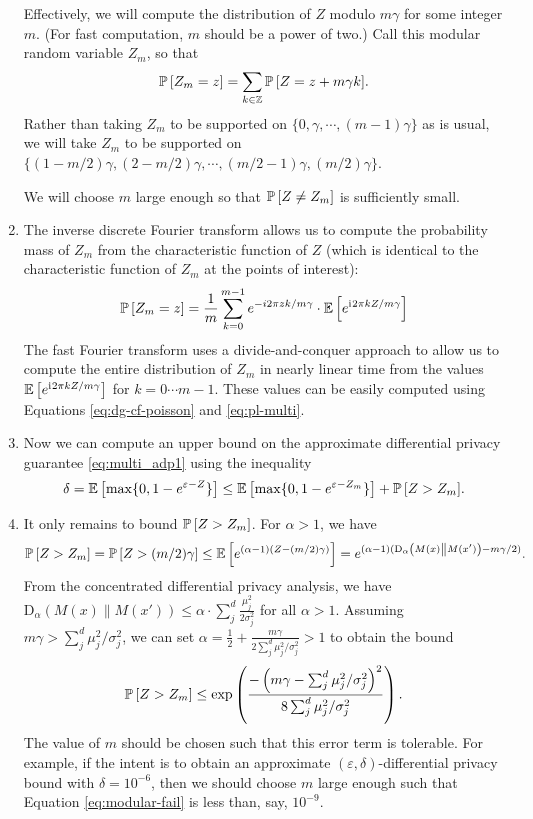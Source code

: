 \documentclass{jpc}
\newcommand{\ii}{\mathrm{i}\mkern1mu}
\newcommand{\ex}[2]{{\ifx&#1& \mathbb{E} \else
\underset{#1}{\mathbb{E}} \fi \left[#2\right]}}
\newcommand{\pr}[2]{{\ifx&#1& \mathbb{P} \else
\underset{#1}{\mathbb{P}} \fi \left[#2\right]}}
\newcommand{\dr}[3]{\mathrm{D}_{#1}\left(#2\middle\|#3\right)}
\newcommand{\eps}{\varepsilon}
\newcommand{\Z}{\mathbb{Z}}
\begin{document}
\begin{enumerate}
    Effectively, we will compute the distribution of $Z$ modulo $m\gamma$ for some integer $m$. (For fast computation, $m$ should be a power of two.) Call this modular random variable $Z_m$, so that \[\pr{}{Z_m=z} = \sum_{k \in \Z} \pr{}{Z=z+m\gamma k}.\]
    Rather than taking $Z_m$ to be supported on $\{0,\gamma,\cdots,(m-1)\gamma\}$ as is usual, we will take $Z_m$ to be supported on $\{(1-m/2)\gamma,(2-m/2)\gamma, \cdots, (m/2-1)\gamma,(m/2)\gamma\}$.
    
    We will choose $m$ large enough so that $\pr{}{Z \ne Z_m}$ is sufficiently small.
    
    \item The inverse discrete Fourier transform allows us to compute the probability mass of $Z_m$ from the characteristic function of $Z$ (which is identical to the characteristic function of $Z_m$ at the points of interest):
    \begin{equation}
        \pr{}{Z_m=z} = \frac{1}{m} \sum_{k=0}^{m-1} e^{-i 2\pi zk / m\gamma} \cdot \ex{}{e^{\ii{} 2\pi k Z/m\gamma}}\\
    \end{equation}
    The fast Fourier transform uses a divide-and-conquer approach to allow us to compute the entire distribution of $Z_m$ in nearly linear time from the values $\ex{}{e^{\ii{}2\pi k Z / m\gamma}}$ for $k=0 \cdots m-1$. These values can be easily computed using Equations \ref{eq:dg-cf-poisson} and \ref{eq:pl-multi}.
    
    \item Now we can compute an upper bound on the approximate differential privacy guarantee \eqref{eq:multi_adp1} using the inequality
    \begin{equation}
        \delta = \ex{}{\max\{0, 1-e^{\eps-Z}\}} \le \ex{}{\max\{0, 1-e^{\eps-Z_m}\}} + \pr{}{Z>Z_m}.
    \end{equation}
    
    \item It only remains to bound $\pr{}{Z>Z_m}$. For $\alpha>1$, we have
    \begin{equation}
        \pr{}{Z>Z_m} = \pr{}{Z > (m/2)\gamma} \le \ex{}{e^{(\alpha-1)(Z-(m/2)\gamma)}} = e^{(\alpha-1)(\dr{\alpha}{M(x)}{M(x')} -m \gamma /2 )}.
    \end{equation}
    From the concentrated differential privacy analysis, we have $\dr{\alpha}{M(x)}{M(x')} \le \alpha \cdot \sum_j^d \frac{\mu_j^2}{2\sigma_j^2}$ for all $\alpha>1$. Assuming $m\gamma > \sum_j^d \mu_j^2/\sigma_j^2$, we can set $\alpha = \frac12 + \frac{m\gamma}{2\sum_j^d \mu_j^2/\sigma_j^2}>1$ to obtain the bound 
    \begin{equation}
        \pr{}{Z>Z_m} \le \exp\left(\frac{-\left(m\gamma - \sum_j^d \mu_j^2/\sigma_j^2\right)^2}{8\sum_j^d \mu_j^2/\sigma_j^2}\right).\label{eq:modular-fail}
    \end{equation}
    The value of $m$ should be chosen such that this error term is tolerable. For example, if the intent is to obtain an approximate $(\eps,\delta)$-differential privacy bound with $\delta=10^{-6}$, then we should choose $m$ large enough such that Equation \ref{eq:modular-fail} is less than, say, $10^{-9}$.
    

\end{enumerate}
\end{document}
